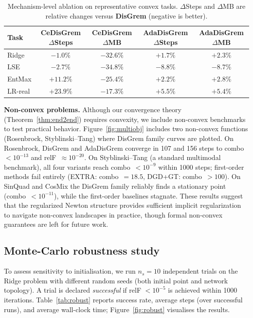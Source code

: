 \documentclass[11pt,a4paper]{article}
\begin{document}
	\begin{table}[t]
		\centering
		\caption{Mechanism-level ablation on representative convex tasks.
			$\Delta$Steps and $\Delta$MB are relative changes versus \textbf{DisGrem}
			(negative is better).}
		\label{tab:ablation}
		\begin{tabular}{lcccc}
			\toprule
			Task & CeDisGrem $\Delta$Steps & CeDisGrem $\Delta$MB & AdaDisGrem $\Delta$Steps & AdaDisGrem $\Delta$MB \\
			\midrule
			Ridge   & $-1.0\%$  & $-32.6\%$ & $+1.7\%$ & $+2.3\%$ \\
			LSE     & $-2.7\%$  & $-34.8\%$ & $-8.8\%$ & $-8.7\%$ \\
			EntMax  & $+11.2\%$ & $-25.4\%$ & $+2.2\%$ & $+2.8\%$ \\
			LR-real & $+23.9\%$ & $-17.3\%$ & $+5.5\%$ & $+5.4\%$ \\
			\bottomrule
		\end{tabular}
	\end{table}
	
	\noindent\textbf{Non-convex problems.}
	Although our convergence theory (Theorem~\ref{thm:end2end}) requires convexity,
	we include non-convex benchmarks to test practical behavior.
	Figure~\ref{fig:multiobj} includes two non-convex functions (Rosenbrock, Styblinski--Tang)
	where DisGrem family curves are plotted.
	On Rosenbrock, DisGrem and AdaDisGrem converge in 107 and 156 steps to
	combo~$<10^{-13}$ and relF~$\approx 10^{-20}$.
	On Styblinski--Tang (a standard multimodal benchmark), all four variants reach
	combo~$<10^{-9}$ within 1000 steps; first-order methods fail entirely
	(EXTRA: combo~$=18.5$, DGD+GT: combo~$>100$).
	On SinQuad and CosMix the DisGrem family reliably finds a stationary point
	(combo~$<10^{-11}$), while the first-order baselines stagnate.
	These results suggest that the regularized Newton structure provides sufficient
	implicit regularization to navigate non-convex landscapes in practice,
	though formal non-convex guarantees are left for future work.
	
	\subsection{Monte-Carlo robustness study}\label{ssec:robust}
	
	To assess sensitivity to initialisation, we run $n_s=10$ independent trials on the
	Ridge problem with different random seeds (both initial point and network topology).
	A trial is declared \emph{successful} if relF $<10^{-5}$ is achieved within 1000 iterations.
	Table~\ref{tab:robust} reports success rate, average steps (over successful runs),
	and average wall-clock time; Figure~\ref{fig:robust} visualises the results.
	
\end{document}
